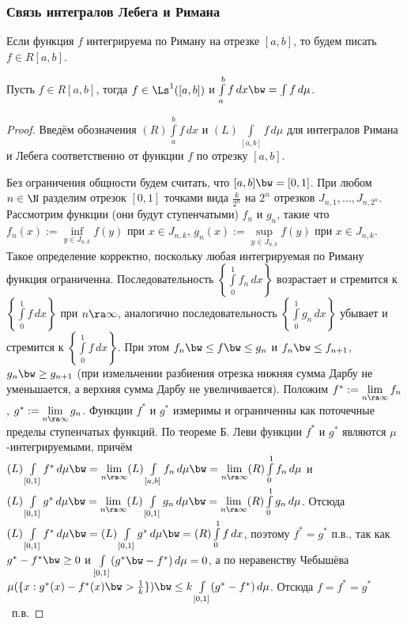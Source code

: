\documentclass[10pt]{article}
\begin{document}
\subsubsection{Связь интегралов Лебега и Римана}

Если функция $f$ интегрируема по Риману на отрезке $[a,b]$, то будем
писать $f\in R[a,b]$.

\begin{theorem}
Пусть $f\in R[a,b]$, тогда $f\in \Ls^1([a,b])$ и
$\int\limits_a^bf\,dx\bw =\int f\,d\mu$.
\end{theorem}

\begin{proof} Введём обозначения $(R)\int\limits_a^bf\,dx$ и
$(L)\int\limits_{[a,b]}f\,d\mu$ для интегралов Римана и Лебега
соответственно от функции $f$ по отрезку $[a,b]$.

Без ограничения общности будем считать, что $[a,b]\bw =[0,1]$. При
любом $n\in\N$ разделим отрезок $[0,1]$ точками вида $\frac{k}{2^n}$
на $2^n$ отрезков $J_{n,1},\ldots,J_{n,2^n}$. Рассмотрим функции
(они будут ступенчатыми) $f_n$ и $g_n$, такие что
$f_n(x):=\inf\limits_{y\in J_{n,k}}f(y)$ при $x\in J_{n,k}$,
$g_n(x):=\sup\limits_{y\in J_{n,k}}f(y)$ при $x\in J_{n,k}$. Такое
определение корректно, поскольку любая интегрируемая по Риману
функция ограниченна. Последовательность
$\left\{\int\limits_0^1f_n\,dx\right\}$ возрастает и стремится к
$\left\{\int\limits_0^1f\,dx\right\}$ при $n\ra\infty$, аналогично
последовательность $\left\{\int\limits_0^1g_n\,dx\right\}$ убывает и
стремится к $\left\{\int\limits_0^1f\,dx\right\}$. При этом $f_n\bw
\le f\bw \le g_n$ и $f_n\bw \le f_{n+1}$, $g_n\bw \ge g_{n+1}$ (при
измельчении разбиения отрезка нижняя сумма Дарбу не уменьшается, а
верхняя сумма Дарбу не увеличивается). Положим
$f^*:=\lim\limits_{n\ra \infty}f_n$, $g^*:=\lim\limits_{n\ra
\infty}g_n$. Функции $f^*$ и $g^*$  измеримы и ограниченны как
поточечные пределы ступенчатых функций. По теореме Б. Леви функции
$f^*$ и $g^*$ являются $\mu$-интегрируемыми, причём
$(L)\int\limits_{[0,1]}f^*\,d\mu\bw =\lim\limits_{n\ra \infty}(L)
\int\limits_{[a,b]}f_n\,d\mu\bw =\lim\limits_{n\ra \infty}(R)
\int\limits_0^1f_n\,d\mu$ и $(L)\int\limits_{[0,1]}g^*\,d\mu\bw
=\lim\limits_{n\ra \infty}(L) \int\limits_{[0,1]}g_n\,d\mu\bw
=\lim\limits_{n\ra \infty}(R) \int\limits_0^1g_n\,d\mu$. Отсюда
$(L)\int\limits_{[0,1]}f^*\,d\mu\bw
=(L)\int\limits_{[0,1]}g^*\,d\mu\bw =(R)\int\limits_0^1f\,dx$,
поэтому $f^*=g^*$ п.в., так как $g^*-f^*\bw\ge0$ и
$\int\limits_{[0,1]}(g^*\bw -f^*)\,d\mu=0$, а по неравенству
Чебышёва $\mu(\{x:g^*(x)-f^*(x)\bw >\frac1k\})\bw \le
k\int\limits_{[0,1]}(g^*-f^*)\,d\mu$. Отсюда $f=f^*=g^*$~п.в.
\end{proof}
\end{document}
